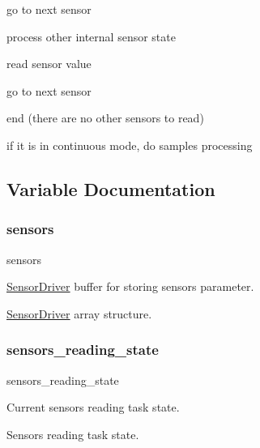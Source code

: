go to next sensor

process other internal sensor state

read sensor value

go to next sensor

end (there are no other sensors to read)

if it is in continuous mode, do samples processing 

\subsection{Variable Documentation}
\mbox{\label{i2c-th_8h_ac07b59f913caef2eaea4e4bb93c901e9}} 
\subsubsection{\texorpdfstring{sensors}{sensors}}
{\footnotesize\ttfamily sensors}



\hyperlink{classSensorDriver}{Sensor\+Driver} buffer for storing sensors parameter. 

\hyperlink{classSensorDriver}{Sensor\+Driver} array structure. \mbox{\label{i2c-th_8h_a2ad2494d7aa3d5924b49127e1acefe40}} 
\subsubsection{\texorpdfstring{sensors\+\_\+reading\+\_\+state}{sensors\_reading\_state}}
{\footnotesize\ttfamily sensors\+\_\+reading\+\_\+state}



Current sensors reading task state. 

Sensors reading task state. 